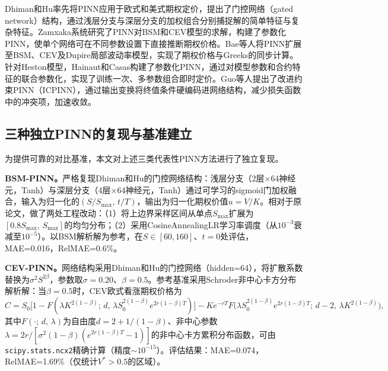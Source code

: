 Dhiman和Hu\cite{dhiman2023pinn}率先将PINN应用于欧式和美式期权定价，提出了门控网络（gated network）结构，通过浅层分支与深层分支的加权组合分别捕捉解的简单特征与复杂特征。Zamxaka\cite{zamxaka2023cev}系统研究了PINN对BSM和CEV模型的求解，构建了参数化PINN，使单个网络可在不同参数设置下直接推断期权价格。Bae等人\cite{bae2024localvol}将PINN扩展至BSM、CEV及Dupire局部波动率模型，实现了期权价格与Greeks的同步计算。针对Heston模型，Hainaut和Casas\cite{hainaut2024heston}构建了参数化PINN，通过对模型参数和合约特征的联合参数化，实现了训练一次、多参数组合即时定价。Guo等人\cite{guo2024icpinn}提出了改进约束PINN（ICPINN），通过输出变换将终值条件硬编码进网络结构，减少损失函数中的冲突项，加速收敛。

\subsection{三种独立PINN的复现与基准建立}\label{subsec:reproduction}

为提供可靠的对比基准，本文对上述三类代表性PINN方法进行了独立复现。

\textbf{BSM-PINN。}严格复现Dhiman和Hu\cite{dhiman2023pinn}的门控网络结构：浅层分支（2层$\times$64神经元，Tanh）与深层分支（4层$\times$64神经元，Tanh）通过可学习的sigmoid门加权融合，输入为归一化的$(S/S_{\max},\,t/T)$，输出为归一化期权价值$u=V/K$。相对于原论文，做了两处工程改动：（1）将上边界采样区间从单点$S_{\max}$扩展为$[0.8S_{\max},\,S_{\max}]$的均匀分布；（2）采用CosineAnnealingLR学习率调度（从$10^{-3}$衰减至$10^{-5}$）。以BSM解析解为参考，在$S\in[60,160]$、$t=0$处评估，MAE=0.016，RelMAE=0.6\%。

\textbf{CEV-PINN。}网络结构采用Dhiman和Hu\cite{dhiman2023pinn}的门控网络（hidden=64），将扩散系数替换为$\sigma^2 S^{2\beta}$，参数取$\sigma=0.20$、$\beta=0.5$。参考基准采用Schroder\cite{schroder1989computing}非中心卡方分布解析解：当$\beta=0.5$时，CEV欧式看涨期权价格为
\begin{equation}
  C = S_0\bigl[1 - F(\lambda K^{2(1-\beta)};\,d,\,\lambda S_0^{2(1-\beta)}e^{2r(1-\beta)T})\bigr]
    - Ke^{-rT} F\!\bigl(\lambda S_0^{2(1-\beta)}e^{2r(1-\beta)T};\,d-2,\,\lambda K^{2(1-\beta)}\bigr),
\end{equation}
其中$F(\cdot;\,d,\,\lambda)$为自由度$d=2+1/(1-\beta)$、非中心参数$\lambda=2r/[\sigma^2(1-\beta)(e^{2r(1-\beta)T}-1)]$的非中心卡方累积分布函数，可由\texttt{scipy.stats.ncx2}精确计算（精度$\sim10^{-15}$）。评估结果：MAE=0.074，RelMAE=1.69\%（仅统计$V^*>0.5$的区域）。

